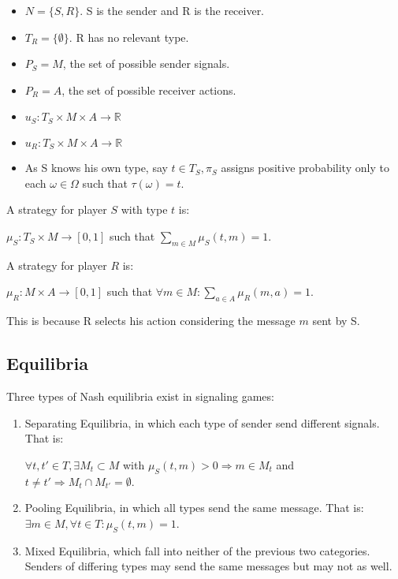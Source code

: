 \documentclass{article}
\begin{document}
\begin{itemize}
\item $N = \{S, R\}$. S is the sender and R is the receiver.
\item $T_{R} = \{\emptyset\}$. R has no relevant type.
\item $P_{S} = M$, the set of possible sender signals.
\item $P_{R} = A$, the set of possible receiver actions. 
\item $u_{S}: T_{S} \times M \times A \to \mathbb{R}$
\item $u_{R}: T_{S} \times M \times A \to \mathbb{R}$
\item As S knows his own type, say $t \in T_{S}, \pi_{S}$ assigns positive probability only to each $\omega \in \Omega$ such that $\tau(\omega) = t$.
\end{itemize}

\noindent A strategy for player $S$ with type $t$ is:

$\mu_S: T_S \times M \to [0,1]$ such that $\sum_{m \in M} \mu_S(t, m) = 1$.

\noindent A strategy for player $R$ is:

$\mu_R: M \times A \to [0,1]$ such that $\forall m \in M: \sum_{a \in A} \mu_R(m, a) = 1$.

\noindent This is because R selects his action considering the message $m$ sent by S.

\subsection{Equilibria}

Three types of Nash equilibria exist in signaling games:

\begin{enumerate}
\item Separating Equilibria, in which each type of sender send different signals. That is:

$\forall t, t' \in T, \exists M_{t} \subset M$ with $\mu_S(t,m) > 0 \Rightarrow m \in M_{t}$ and $t \ne t' \Rightarrow M_{t} \cap M_{t'} = \emptyset$.

\item Pooling Equilibria, in which all types send the same message. That is: $\exists  m \in M, \forall t \in T : \mu_S(t,m) = 1$.

\item Mixed Equilibria, which fall into neither of the previous two categories. Senders of differing types may send the same messages but may not as well. 
\end{enumerate}
\end{document}
